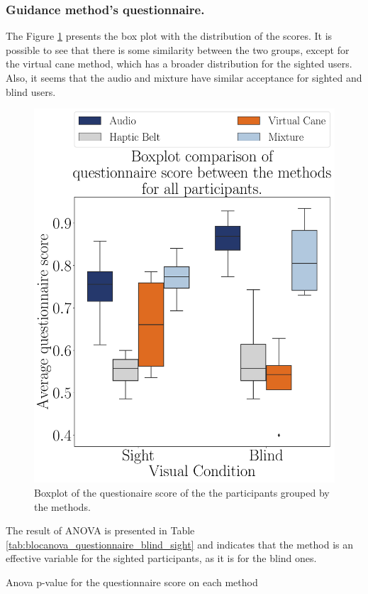 \subsubsection{Guidance method's questionnaire.}
\label{subsubsec:results_questionnaires_2}

The Figure \ref{fig:boxplot_questionnaire_scene} presents the box plot with the distribution of the scores. It is possible to see that there is some similarity between the two groups, except for the virtual cane method, which has a broader distribution for the sighted users. Also, it seems that the audio and mixture have similar acceptance for sighted and blind users.

\begin{figure}[!htb]
    \centering
    \includegraphics[width = 0.75\linewidth]{3 - Resultados/Figuras/boxplot_questionnaire_scene.pdf}
    \caption{Boxplot of the questionaire score of the the participants grouped by the methods.}
    \label{fig:boxplot_questionnaire_scene}
\end{figure}

The result of ANOVA is presented in Table \ref{tab:blocanova_questionnaire_blind_sight} and indicates that the method is an effective variable for the sighted participants, as it is for the blind ones.

\begin{table}[!htb]
    \caption{Anova p-value for the questionnaire score on each method}
    \label{tab:blocanova_questionnaire_blind_sight}
\begin{minipage}{0.45\linewidth}
    
\end{minipage}%
\begin{minipage}{0.05\linewidth}
\end{minipage}%
\begin{minipage}{0.45\linewidth}
    
\end{minipage}
\end{table}

